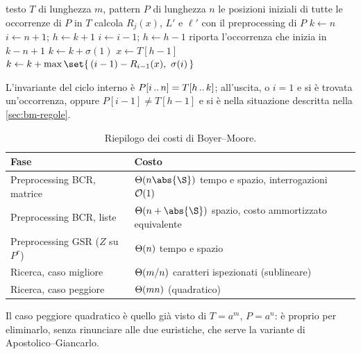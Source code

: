 \begin{algorithm}[H]
\caption{Boyer--Moore: ciclo di ricerca}
\begin{algorithmic}[1]
\Require testo $T$ di lunghezza $m$, pattern $P$ di lunghezza $n$
\Ensure le posizioni iniziali di tutte le occorrenze di $P$ in $T$
\State calcola $R_j(x)$, $L'$ e $\ell'$ con il preprocessing di $P$
\State $k \gets n$ 
  \State $i \gets n+1$; \quad $h \gets k+1$
    \State $i \gets i-1$; \quad $h \gets h-1$
  \EndWhile
    \State riporta l'occorrenza che inizia in $k-n+1$
    \State $k \gets k+\sigma(1)$
  \Else
    \State $x \gets T[h-1]$ 
    \State $k \gets k+\max\set{\,(i-1)-R_{i-1}(x),\ \sigma(i)\,}$
  \EndIf
\EndWhile
\end{algorithmic}
\end{algorithm}

L'invariante del ciclo interno è $P[i\,..\,n]=T[h\,..\,k]$; all'uscita, o $i=1$
e si è trovata un'occorrenza, oppure $P[i-1]\neq T[h-1]$ e si è nella situazione
descritta nella \autoref{sec:bm-regole}.

\begin{table}[H]
\centering
\begin{tabular}{ll}
\toprule
\textbf{Fase} & \textbf{Costo} \\
\midrule
Preprocessing BCR, matrice & $\Th(n\abs{\alfa})$ tempo e spazio, interrogazioni $\mathcal{O}(1)$ \\
Preprocessing BCR, liste   & $\Th(n+\abs{\alfa})$ spazio, costo ammortizzato equivalente \\
Preprocessing GSR ($Z$ su $P^r$) & $\Theta(n)$ tempo e spazio \\
Ricerca, caso migliore     & $\Theta(m/n)$ caratteri ispezionati (sublineare) \\
Ricerca, caso peggiore     & $\Theta(mn)$ (quadratico) \\
\bottomrule
\end{tabular}
\caption{Riepilogo dei costi di Boyer--Moore.}
\end{table}

Il caso peggiore quadratico è quello già visto di $T=a^{m}$, $P=a^{n}$: è proprio
per eliminarlo, senza rinunciare alle due euristiche, che serve la variante di
Apostolico--Giancarlo.
